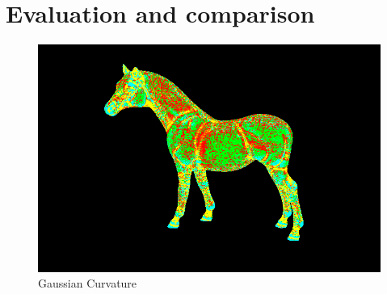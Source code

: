 \documentclass[12pt]{report}
\begin{document}
\section{Evaluation and comparison}
\begin{figure}[!htb]
    \includegraphics[width=\linewidth]{gaussian.png}
    \caption{Gaussian Curvature}\label{fig:gaussian-horse}
  \endminipage
  \end{figure}
\end{document}
